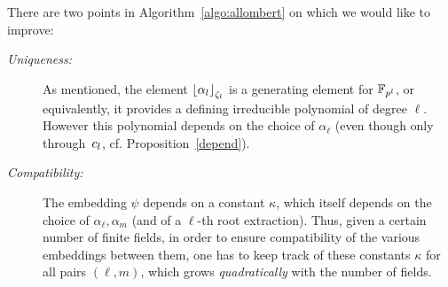 \documentclass{sig-alternate}
\begin{document}
There are two points in Algorithm~\ref{algo:allombert} on which we would like to improve:
\begin{description}
\item[\emph{Uniqueness:}] As mentioned, the element $\left\lfloor \alpha_{l} \right\rfloor_{\zeta_l}$ is a generating element for $\mathbb{F}_{p^{l}}$,
or equivalently, it provides a defining irreducible polynomial of degree $\ell$.
However this polynomial depends on the choice of $\alpha_{\ell}$
(even though only through~$c_l$, cf. Proposition~\ref{depend}).
\item[\emph{Compatibility:}] The embedding $\psi$ depends on a constant $\kappa$,
which itself depends on the choice of $\alpha_\ell,\alpha_m$ (and of a $\ell$-th root extraction).
Thus, given a certain number of finite fields, in order to ensure compatibility of the various
embeddings between them, one has to keep track of these constants $\kappa$
for all pairs $(\ell,m)$,
which grows \emph{quadratically} with the number of fields.
\end{description}
\end{document}
